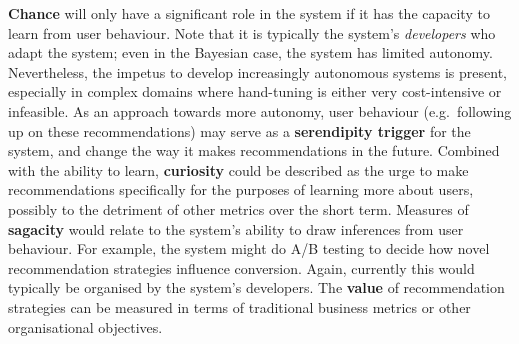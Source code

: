 \textbf{Chance} will only have a significant role in the system if it
has the capacity to learn from user behaviour.
Note that it is typically the system's \emph{developers} who adapt the system; even in the Bayesian case, the system has limited autonomy. Nevertheless, the impetus to develop increasingly autonomous systems is present, especially in complex domains where hand-tuning is either very cost-intensive or infeasible. As an approach towards more autonomy, user behaviour (e.g.~following up on these recommendations) may serve as a \textbf{serendipity trigger} for the system, and change the way it makes recommendations in the future. Combined with the ability to learn, \textbf{curiosity} could be described as the urge to make recommendations specifically for the purposes of learning more about users, possibly to the detriment of other metrics over the short term. Measures of \textbf{sagacity} would relate to the system's ability to
draw inferences from user behaviour.  For example, the system might do A/B testing to decide how novel recommendation strategies influence conversion.  Again, currently this would typically be organised by the system's developers.  The \textbf{value} of recommendation strategies
can be measured in terms of traditional business metrics or other organisational objectives.

